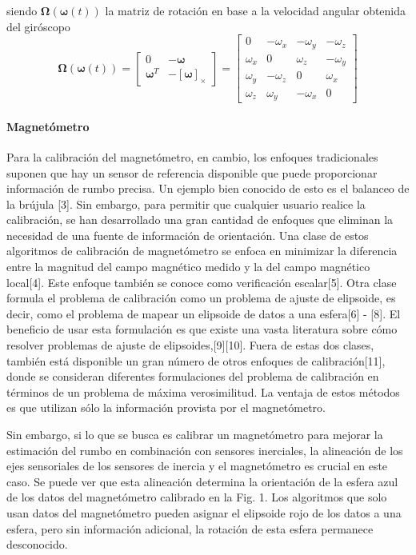 siendo $\bm{\Omega}(\bm{\omega}(t))$ la matriz de rotación en base a la velocidad angular obtenida del giróscopo
\begin{equation}
    \bm{\Omega}(\bm{\omega}(t)) =
    \begin{bmatrix}
        0 & -\bm{\omega} \\
        \bm{\omega}^T & -\left[\bm{\omega}\right]_\times
    \end{bmatrix}
    =
    \begin{bmatrix}
        0 & -\omega_x & -\omega_y & -\omega_z \\
        \omega_x & 0 & \omega_z & -\omega_y \\
        \omega_y & -\omega_z & 0 & \omega_x \\
        \omega_z & \omega_y & -\omega_x & 0
    \end{bmatrix}
\end{equation}

\paragraph{Magnetómetro}
Para la calibración del magnetómetro, en cambio, los enfoques tradicionales suponen que hay un sensor de referencia disponible que puede proporcionar información de rumbo precisa. Un ejemplo bien conocido de esto es el balanceo de la brújula [3]. Sin embargo, para permitir que cualquier usuario realice la calibración, se han desarrollado una gran cantidad de enfoques que eliminan la necesidad de una fuente de información de orientación. Una clase de estos algoritmos de calibración de magnetómetro se enfoca en minimizar la diferencia entre la magnitud del campo magnético medido y la del campo magnético local[4]. Este enfoque también se conoce como verificación escalar[5]. Otra clase formula el problema de calibración como un problema de ajuste de elipsoide, es decir, como el problema de mapear un elipsoide de datos a una esfera[6] - [8]. El beneficio de usar esta formulación es que existe una vasta literatura sobre cómo resolver problemas de ajuste de elipsoides,[9][10]. Fuera de estas dos clases, también está disponible un gran número de otros enfoques de calibración[11], donde se consideran diferentes formulaciones del problema de calibración en términos de un problema de máxima verosimilitud. La ventaja de estos métodos es que utilizan sólo la información provista por el magnetómetro.

Sin embargo, si lo que se busca es calibrar un magnetómetro para mejorar la estimación del rumbo en combinación con sensores inerciales, la alineación de los ejes sensoriales de los sensores de inercia y el magnetómetro es crucial en este caso. Se puede ver que esta alineación determina la orientación de la esfera azul de los datos del magnetómetro calibrado en la Fig. 1. Los algoritmos que solo usan datos del magnetómetro pueden asignar el elipsoide rojo de los datos a una esfera, pero sin información adicional, la rotación de esta esfera permanece desconocido.

